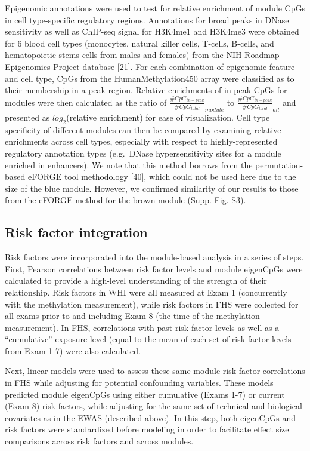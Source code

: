 \documentclass[]{article}
\theoremstyle{definition}
\theoremstyle{definition}
\theoremstyle{definition}
\theoremstyle{remark}
\begin{document}
Epigenomic annotations were used to test for relative enrichment of
module CpGs in cell type-specific regulatory regions. Annotations for
broad peaks in DNase sensitivity as well as ChIP-seq signal for H3K4me1
and H3K4me3 were obtained for 6 blood cell types (monocytes, natural
killer cells, T-cells, B-cells, and hematopoietic stems cells from males
and females) from the NIH Roadmap Epigenomics Project database {[}21{]}.
For each combination of epigenomic feature and cell type, CpGs from the
HumanMethylation450 array were classified as to their membership in a
peak region. Relative enrichments of in-peak CpGs for modules were then
calculated as the ratio of
\(\frac{\#CpG_{in-peak}}{\#CpG_{total}}_{module}\) to
\(\frac{\#CpG_{in-peak}}{\#CpG_{total}}_{all}\) and presented as
\(log_2\)(relative enrichment) for ease of visualization. Cell type
specificity of different modules can then be compared by examining
relative enrichments across cell types, especially with respect to
highly-represented regulatory annotation types (e.g.~DNase
hypersensitivity sites for a module enriched in enhancers). We note that
this method borrows from the permutation-based eFORGE tool methodology
{[}40{]}, which could not be used here due to the size of the blue
module. However, we confirmed similarity of our results to those from
the eFORGE method for the brown module (Supp. Fig. S3).

\subsection{Risk factor integration}\label{risk-factor-integration}

Risk factors were incorporated into the module-based analysis in a
series of steps. First, Pearson correlations between risk factor levels
and module eigenCpGs were calculated to provide a high-level
understanding of the strength of their relationship. Risk factors in WHI
were all measured at Exam 1 (concurrently with the methylation
measurement), while risk factors in FHS were collected for all exams
prior to and including Exam 8 (the time of the methylation measurement).
In FHS, correlations with past risk factor levels as well as a
``cumulative'' exposure level (equal to the mean of each set of risk
factor levels from Exam 1-7) were also calculated.

Next, linear models were used to assess these same module-risk factor
correlations in FHS while adjusting for potential confounding variables.
These models predicted module eigenCpGs using either cumulative (Exams
1-7) or current (Exam 8) risk factors, while adjusting for the same set
of technical and biological covariates as in the EWAS (described above).
In this step, both eigenCpGs and risk factors were standardized before
modeling in order to facilitate effect size comparisons across risk
factors and across modules.
\end{document}
